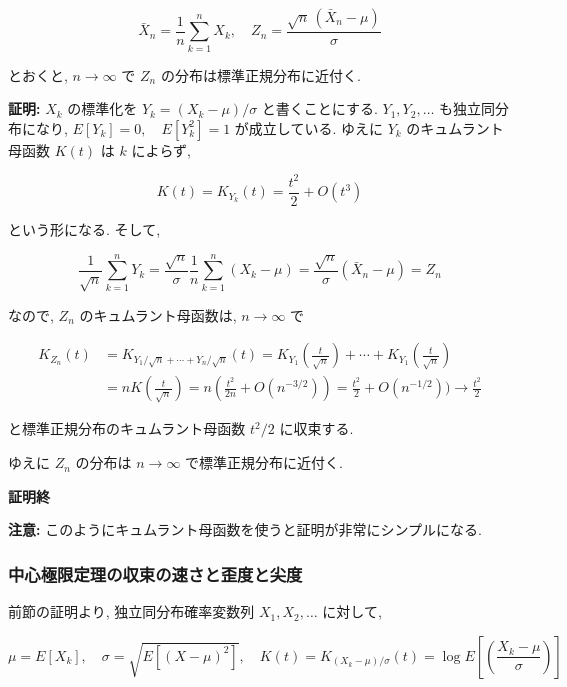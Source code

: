 \documentclass[10pt, a4paper,xelatex,ja=standard]{bxjsarticle}
\begin{document}
\[
\bar{X}_n = \frac{1}{n}\sum_{k=1}^n X_k, \quad
Z_n = \frac{\sqrt{n}\,(\bar{X}_n - \mu)}{\sigma}
\]

とおくと, \(n\to\infty\) で \(Z_n\) の分布は標準正規分布に近付く.

\textbf{証明:} \(X_k\) の標準化を \(Y_k = (X_k - \mu)/\sigma\)
と書くことにする. \(Y_1, Y_2, \ldots\) も独立同分布になり,
\(E[Y_k] = 0, \quad E[Y_k^2] = 1\) が成立している. ゆえに \(Y_k\)
のキュムラント母函数 \(K(t)\) は \(k\) によらず,

\[
K(t) = K_{Y_k}(t) = \frac{t^2}{2} + O(t^3)
\]

という形になる. そして,

\[
\frac{1}{\sqrt{n}}\sum_{k=1}^n Y_k =
\frac{\sqrt{n}}{\sigma}\frac{1}{n}\sum_{k=1}^n (X_k - \mu) =
\frac{\sqrt{n}}{\sigma}(\bar{X}_n - \mu) = Z_n
\]

なので, \(Z_n\) のキュムラント母函数は, \(n\to\infty\) で

\[
\begin{aligned}
K_{Z_n}(t) &=
K_{Y_1/\sqrt{n}+\cdots+Y_n/\sqrt{n}}(t) =
K_{Y_1}\left(\frac{t}{\sqrt{n}}\right) + \cdots + K_{Y_1}\left(\frac{t}{\sqrt{n}}\right) \\ &=
n K\left(\frac{t}{\sqrt{n}}\right) =
n\left(\frac{t^2}{2n} + O(n^{-3/2})\right) =
\frac{t^2}{2} + O(n^{-1/2})) \to
\frac{t^2}{2}
\end{aligned}
\]

と標準正規分布のキュムラント母函数 \(t^2/2\) に収束する.

ゆえに \(Z_n\) の分布は \(n\to\infty\) で標準正規分布に近付く.

\textbf{証明終}

\textbf{注意:}
このようにキュムラント母函数を使うと証明が非常にシンプルになる.

    \hypertarget{ux4e2dux5fc3ux6975ux9650ux5b9aux7406ux306eux53ceux675fux306eux901fux3055ux3068ux6b6aux5ea6ux3068ux5c16ux5ea6}{%
\subsubsection{中心極限定理の収束の速さと歪度と尖度}\label{ux4e2dux5fc3ux6975ux9650ux5b9aux7406ux306eux53ceux675fux306eux901fux3055ux3068ux6b6aux5ea6ux3068ux5c16ux5ea6}}

前節の証明より, 独立同分布確率変数列 \(X_1,X_2,\ldots\) に対して,

\[
\mu = E[X_k], \quad
\sigma = \sqrt{E[(X-\mu)^2]}, \quad
K(t) = K_{(X_k - \mu)/\sigma}(t) = \log E\left[\left(\frac{X_k-\mu}{\sigma}\right)\right]
\]
\end{document}
